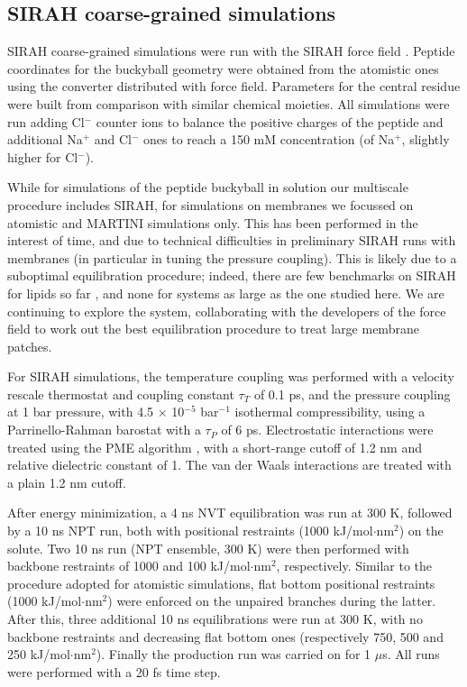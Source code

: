 \subsection{SIRAH coarse-grained simulations}
SIRAH coarse-grained simulations were run with the SIRAH force field \citep{Machado2018}. Peptide coordinates for the buckyball geometry were obtained from the atomistic ones using the converter distributed with force field. Parameters for the central residue were built from comparison with similar chemical moieties. All simulations were run adding Cl$^-$ counter ions to balance the positive charges of the peptide and additional Na$^+$  and Cl$^-$ ones to reach a 150 mM concentration (of Na$^+$, slightly higher for Cl$^-$).

While for simulations of the peptide buckyball in solution our multiscale procedure includes SIRAH, for simulations on membranes we focussed on atomistic and MARTINI simulations only. This has been performed in the interest of time, and due to technical difficulties in preliminary SIRAH runs with membranes (in particular in tuning the pressure coupling).
%
This is likely due to a suboptimal equilibration procedure; indeed, there are few benchmarks on SIRAH for lipids so far \citep{Barrera2019}, and none for systems as large as the one studied here. We are continuing to explore the system, collaborating with the developers of the force field to work out the best equilibration procedure to treat large membrane patches.

For SIRAH simulations, the temperature coupling was performed with a velocity rescale thermostat \citep{Bussi2007} and coupling constant $\tau _T$ of 0.1 ps, and the pressure coupling at 1 bar pressure, with 4.5 $\times$ 10$^{-5}$ bar$^{-1}$ isothermal compressibility, using a Parrinello-Rahman barostat \citep{Parrinello1981} with a $\tau _P$ of 6 ps. Electrostatic interactions were treated using the PME algorithm \citep{Essmann1995}, with a short-range cutoff of 1.2 nm and relative dielectric constant of 1. The van der Waals interactions are treated with a plain 1.2 nm cutoff.

After energy minimization, a 4 ns NVT equilibration was run at 300 K, followed by a 10 ns NPT run, both with positional restraints (1000 kJ/mol$\cdot$nm$^2$) on the solute. Two 10 ns run (NPT ensemble, 300 K) were then performed with backbone restraints of 1000 and 100 kJ/mol$\cdot$nm$^2$, respectively. Similar to the procedure adopted for atomistic simulations, flat bottom positional restraints (1000 kJ/mol$\cdot$nm$^2$) were enforced on the unpaired branches during the latter. After this, three additional 10 ns equilibrations were run at 300 K, with no backbone restraints and decreasing flat bottom ones (respectively 750, 500 and 250 kJ/mol$\cdot$nm$^2$). Finally the production run was carried on for 1 $\mu$s. All runs were performed with a 20 fs time step.


